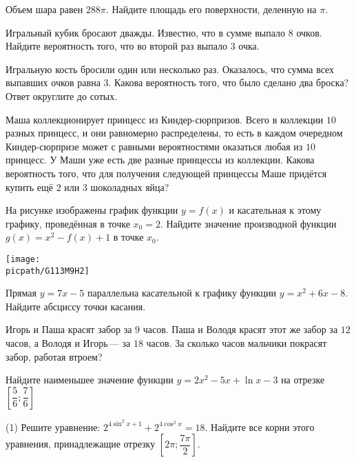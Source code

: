 \begin{homework}[number=2]
	\begin{listofex}
		\item Объем шара равен \( 288\pi \). Найдите площадь его поверхности, деленную на \( \pi \).
		\item Игральный кубик бросают дважды. Известно, что в сумме выпало \( 8 \) очков. Найдите вероятность того, что во второй раз выпало \( 3 \) очка.
		\item Игральную кость бросили один или несколько раз. Оказалось, что сумма всех выпавших очков равна \( 3 \). Какова вероятность того, что было сделано два броска? Ответ округлите до сотых.
		\item Маша коллекционирует принцесс из Киндер-сюрпризов. Всего в коллекции \( 10 \) разных принцесс, и они равномерно распределены, то есть в каждом очередном Киндер-сюрпризе может с равными вероятностями оказаться любая из \( 10 \) принцесс. У Маши уже есть две разные принцессы из коллекции. Какова вероятность того, что для получения следующей принцессы Маше придётся купить ещё \( 2 \) или \( 3 \) шоколадных яйца?
		\item 
		\begin{minipage}[t]{\bodywidth}
			На рисунке изображены график функции \( y=f(x) \) и касательная к этому графику, проведённая в точке \( x_0=2 \). Найдите значение производной функции \( g(x)=x^2-f(x)+1 \) в точке \( x_0 \).
		\end{minipage}
		\gapwidth
		\begin{minipage}[t]{\picwidth}
			\texttt{[image: \\picpath/G113M9H2]}
		\end{minipage}
		\item Прямая \( y=7x-5 \) параллельна касательной к графику функции \( y=x^2+6x-8 \). Найдите абсциссу точки касания.
		\item Игорь и Паша красят забор за \( 9 \) часов. Паша и Володя красят этот же забор за \( 12 \) часов, а Володя и Игорь --- за \( 18 \) часов. За сколько часов мальчики покрасят забор, работая втроем?
		\item Найдите наименьшее значение функции \( y=2x^2-5x+\ln x-3 \) на отрезке \( \left[ \dfrac{5}{6}; \dfrac{7}{6} \right] \)
		\item \begin{tasks}(1)
			\task Решите уравнение: \( 2^{4\sin^2x+1}+2^{4\cos^2x}=18 \).
			\task Найдите все корни этого уравнения, принадлежащие отрезку \( \left[ 2\pi; \dfrac{7\pi}{2} \right] \).

\end{tasks}
\end{listofex}
\end{homework}
